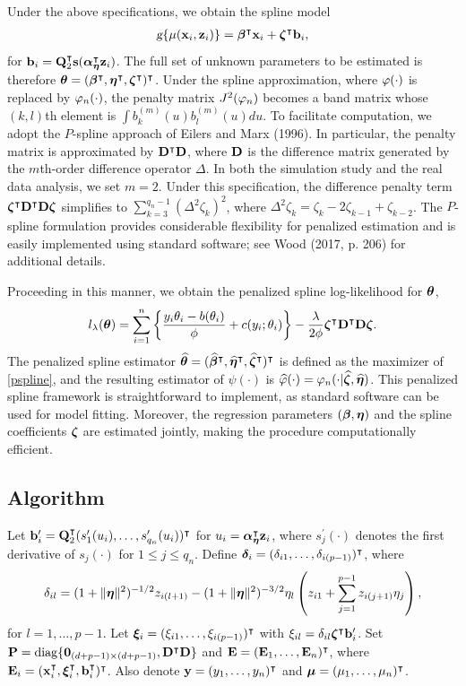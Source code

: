 Under the above specifications, we obtain the spline model
\begin{eqnarray}\label{psmodel}
	\textsl{g}\{\mu(\mathbf{x}_i,\mathbf{z}_i)\} = \bm\beta^\intercal\mathbf{x}_i + \bm\zeta^\intercal\mathbf{b}_i,
\end{eqnarray}
for $\mathbf{b}_i = \mathbf{Q}_2^\intercal\mathbf{s}(\bm\alpha_{\bm\eta}^\intercal\mathbf{z}_i)$. The full set of unknown parameters to be estimated is therefore $\bm\theta = (\bm\beta^\intercal,\bm\eta^\intercal,\bm\zeta^\intercal)^\intercal$. Under the spline approximation, where $\varphi(\cdot)$ is replaced by $\varphi_n(\cdot)$, the penalty matrix $J^2(\varphi_n)$ becomes a band matrix whose $(k,l)$th element is $\int b_k^{(m)}(u)b_l^{(m)}(u)du$. To facilitate computation, we adopt the $P$-spline approach of Eilers and Marx (1996). In particular, the penalty matrix is approximated by $\mathbf{D}^\intercal\mathbf{D}$, where $\mathbf{D}$ is the difference matrix generated by the $m$th-order difference operator $\Delta$. In both the simulation study and the real data analysis, we set $m=2$. Under this specification, the difference penalty term $\bm\zeta^\intercal\mathbf{D}^\intercal\mathbf{D}\bm\zeta$ simplifies to $\sum_{k=3}^{q_n-1}(\Delta^2\zeta_k)^2$, where $\Delta^2\zeta_k = \zeta_k - 2\zeta_{k-1} + \zeta_{k-2}$. The $P$-spline formulation provides considerable flexibility for penalized estimation and is easily implemented using standard software; see Wood (2017, p. 206) for additional details.

Proceeding in this manner, we obtain the penalized spline log-likelihood for $\bm\theta$,
\begin{equation}
	l_\lambda(\bm\theta)
	= \sum_{i=1}^n \left\{\frac{y_i\theta_i - b(\theta_i)}{\phi} + c(y_i;\theta_i)\right\}
	- \frac{\lambda}{2\phi}\bm\zeta^\intercal\mathbf{D}^\intercal\mathbf{D}\bm\zeta.
	\label{pspline}
\end{equation}
The penalized spline estimator $\widehat{\bm\theta} = (\widehat{\bm\beta}^\intercal,\widehat{\bm\eta}^\intercal,\widehat{\bm\zeta}^\intercal)^\intercal$ is defined as the maximizer of \eqref{pspline}, and the resulting estimator of $\psi(\cdot)$ is $\widehat{\varphi}(\cdot) = \varphi_n(\cdot|\widehat{\bm\zeta},\widehat{\bm\eta})$. This penalized spline framework is straightforward to implement, as standard software can be used for model fitting. Moreover, the regression parameters $(\bm\beta,\bm\eta)$ and the spline coefficients $\bm\zeta$ are estimated jointly, making the procedure computationally efficient.



\subsection{Algorithm}
Let $\mathbf{b}_i' = \mathbf{Q}_2^\intercal(s_1'(u_i),\ldots,s_{q_n}'(u_i))^\intercal$
for $u_i = \bm\alpha_{\bm\eta}^\intercal\mathbf{z}_i$, where $s_j^\prime(\cdot)$ denotes the first derivative of $s_j(\cdot)$ for $1\le j\le q_n$. Define $\bm\delta_i = (\delta_{i1},\ldots,\delta_{i(p-1)})^\intercal$, where
$$
\delta_{il} = (1+\|\bm\eta\|^2)^{-1/2} z_{i(l+1)} 
- (1+\|\bm\eta\|^2)^{-3/2}\eta_l\left(z_{i1} + \sum_{j=1}^{p-1} z_{i(j+1)}\eta_j\right),
$$
for $l=1,\ldots,p-1$. Let $\bm\xi_i = (\xi_{i1},\ldots,\xi_{i(p-1)})^\intercal$ with $\xi_{il} = \delta_{il}\bm\zeta^\intercal\mathbf{b}_i'$. Set
$
\mathbf{P} = \mathrm{diag}\{\mathbf{0}_{(d+p-1)\times(d+p-1)},\mathbf{D}^\intercal\mathbf{D}\}$ and $\mathbf{E} = (\mathbf{E}_1,\ldots,\mathbf{E}_n)^\intercal$, where $\mathbf{E}_i = (\mathbf{x}_i^\intercal,\bm\xi_i^\intercal,\mathbf{b}_i^\intercal)^\intercal$. Also denote $\mathbf{y} = (y_1,\ldots,y_n)^\intercal$ and $\bm\mu = (\mu_1,\ldots,\mu_n)^\intercal$.

